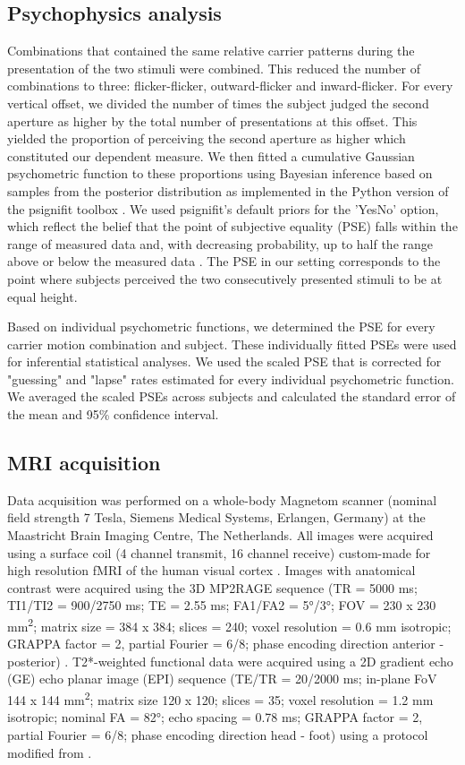 \subsection{Psychophysics analysis}
Combinations that contained the same relative carrier patterns during the presentation of the two stimuli were combined. This reduced the number of combinations to three: flicker-flicker, outward-flicker and inward-flicker. For every vertical offset, we divided the number of times the subject judged the second aperture as higher by the total number of presentations at this offset. This yielded the proportion of perceiving the second aperture as higher which constituted our dependent measure. We then fitted a cumulative Gaussian psychometric function to these proportions using Bayesian inference based on samples from the posterior distribution as implemented in the Python version of the psignifit toolbox \parencite{Frund2011}. We used psignifit's default priors for the 'YesNo' option, which reflect the belief that the point of subjective equality (PSE) falls within the range of measured data and, with decreasing probability, up to half the range above or below the measured data \parencite{Frund2011}. The PSE in our setting corresponds to the point where subjects perceived the two consecutively presented stimuli to be at equal height.

Based on individual psychometric functions, we determined the PSE for every carrier motion combination and subject. These individually fitted PSEs were used for inferential statistical analyses. We used the scaled PSE that is corrected for "guessing" and "lapse" rates estimated for every individual psychometric function. We averaged the scaled PSEs across subjects and calculated the standard error of the mean and 95\% confidence interval.

\subsection{MRI acquisition}
Data acquisition was performed on a whole-body Magnetom scanner (nominal field strength 7 Tesla, Siemens Medical Systems, Erlangen, Germany) at the Maastricht Brain Imaging Centre, The Netherlands. All images were acquired using a surface coil (4 channel transmit, 16 channel receive) custom-made for high resolution fMRI of the human visual cortex \parencite{Sengupta2016}. Images with anatomical contrast were acquired using the 3D MP2RAGE sequence (TR = 5000 ms; TI1/TI2 = 900/2750 ms; TE = 2.55 ms; FA1/FA2 = 5°/3°; FOV = 230 x 230 mm\textsuperscript{2}; matrix size = 384 x 384; slices = 240; voxel resolution = 0.6 mm isotropic; GRAPPA factor = 2, partial Fourier = 6/8; phase encoding direction anterior - posterior) \parencite{Marques2010}. T2*-weighted functional data were acquired using a 2D gradient echo (GE) echo planar image (EPI) sequence (TE/TR = 20/2000 ms; in-plane FoV 144 x 144 mm\textsuperscript{2}; matrix size 120 x 120; slices = 35; voxel resolution = 1.2 mm isotropic; nominal FA = 82°; echo spacing = 0.78 ms; GRAPPA factor = 2, partial Fourier = 6/8; phase encoding direction head - foot) using a protocol modified from \cite{Feinberg2010, Setsompop2012, Moeller2010}.

